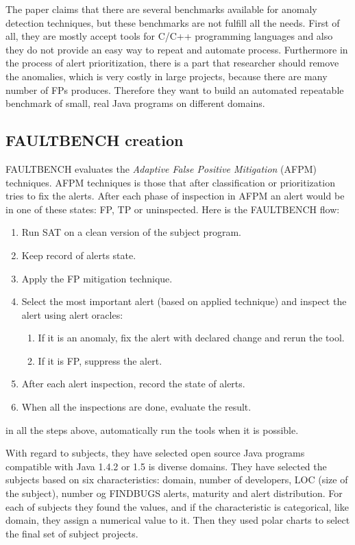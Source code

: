 \documentclass[authoryear,preprint]{sigplanconf}
\begin{document}
The paper claims that there are several benchmarks available for anomaly detection techniques, but these benchmarks are not fulfill all the needs. First of all, they are mostly accept tools for C/C++ programming languages and also they do not provide an easy way to repeat and automate process. Furthermore in the process of alert prioritization, there is a part that researcher should remove the anomalies, which is very costly in large projects, because there are many number of FPs produces. Therefore they want to build an automated repeatable benchmark of small, real Java programs on different domains. 

\subsection{FAULTBENCH creation } 
 FAULTBENCH evaluates the \textit{Adaptive False Positive Mitigation} (AFPM) techniques. AFPM techniques is those that after classification or prioritization tries to fix the alerts. After each phase of inspection in AFPM an alert would be in one of these states: FP, TP or uninspected. Here is the FAULTBENCH flow:

\begin{enumerate}
	\item Run SAT on a clean version of the subject program.
	\item Keep record of alerts state.
	\item Apply the FP mitigation technique. 
	\item Select the most important alert (based on applied technique) and inspect the alert using alert oracles:
	\begin{enumerate}
		\item If it is an anomaly, fix the alert with declared change and rerun the tool.
		\item If it is FP, suppress the alert. 
	\end{enumerate}
	\item After each alert inspection, record the state of alerts.
	\item When all the inspections are done, evaluate the result.
\end{enumerate}
in all the steps above, automatically run the tools when it is possible. 

With regard to subjects, they have selected open source Java programs compatible with Java 1.4.2 or 1.5 is diverse domains. They have selected the subjects based on six characteristics: domain, number of developers, LOC (size of the subject), number og FINDBUGS alerts, maturity and alert distribution. For each of subjects they found the values, and if the characteristic is categorical, like domain, they assign a numerical value to it. Then they used polar charts \cite{boehm2003balancing} to select the final set of subject projects. 
\end{document}
